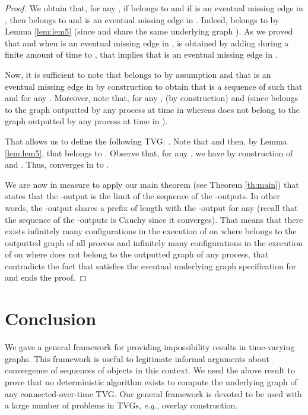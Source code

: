 \documentclass[11pt]{article}
\newcommand{\eg}{{\em e.g.,}\xspace}
\begin{document}
\begin{proof}
We obtain that, for any , if  belongs to  and if  is an eventual missing edge in , then  belongs to  and  is an eventual missing edge in . Indeed,  belongs to  by Lemma \ref{lem:lem5} (since  and  share the same underlying graph ). As we proved that  and  when  is an eventual missing edge in ,  is obtained by adding  during a finite amount of time to , that implies that  is an eventual missing edge in .

Now, it is sufficient to note that  belongs to  by assumption and that  is an eventual missing edge in  by construction to obtain that  is a sequence of  such that  and  for any . Moreover, note that, for any ,  (by construction) and  (since  belongs to the graph outputted by any process at time  in  whereas  does not belong to the graph outputted by any process at time  in ). 

That allows us to define the following TVG: . Note that  and then, by Lemma \ref{lem:lem5}, that  belongs to . Observe that, for any , we have  by construction of  and . Thus,  converges in  to .

We are now in measure to apply our main theorem (see Theorem \ref{th:main}) that states that the -output is the limit of the sequence of the -outputs. In other words, the -output shares a prefix of length  with the -output for any  (recall that the sequence of the -outputs is Cauchy since it converges). That means that there exists infinitely many configurations in the execution of  on  where  belongs to the outputted graph of all process and infinitely many configurations in the execution of  on  where  does not belong to the outputted graph of any process, that contradicts the fact that  satisfies the eventual underlying graph specification for  and ends the proof.
\end{proof}

\section{Conclusion}\label{sec:conc}

We gave a general framework for providing impossibility results in time-varying graphs. This framework is useful to legitimate informal arguments about convergence of sequences of objects in this context. We used the above result to prove that no deterministic algorithm exists to compute the underlying graph of any connected-over-time TVG. Our general framework is devoted to be used with a large number of problems in TVGs, \eg overlay construction.

\begin{small}


\end{small}
\end{document}
